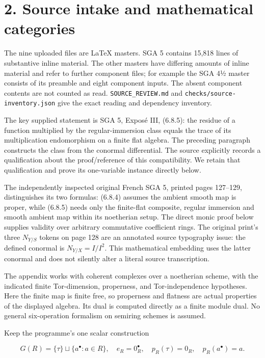 \documentclass[
  11pt,
]{article}
\begin{document}
\section{2. Source intake and mathematical
categories}\label{source-intake-and-mathematical-categories}

The nine uploaded files are LaTeX masters. SGA 5 contains 15,818 lines
of substantive inline material. The other masters have differing amounts
of inline material and refer to further component files; for example the
SGA 4½ master consists of its preamble and eight component inputs. The
absent component contents are not counted as read.
\texttt{SOURCE\_REVIEW.md} and \texttt{checks/source-inventory.json}
give the exact reading and dependency inventory.

The key supplied statement is SGA 5, Exposé III, (6.8.5): the residue of
a function multiplied by the regular-immersion class equals the trace of
its multiplication endomorphism on a finite flat algebra. The preceding
paragraph constructs the class from the conormal differential. The
source explicitly records a qualification about the proof/reference of
this compatibility. We retain that qualification and prove its
one-variable instance directly below.

The independently inspected original French SGA 5, printed pages
127--129, distinguishes its two formulas: (6.8.4) assumes the ambient
smooth map is proper, while (6.8.5) needs only the finite-flat composite,
regular immersion and smooth ambient map within its noetherian setup.
The direct monic proof below supplies validity over arbitrary commutative
coefficient rings.  The original print's three $N_{Y/S}$ tokens on page
128 are an annotated source typography issue: the defined conormal is
$N_{Y/X}=I/I^2$.  This mathematical embedding uses the latter conormal
and does not silently alter a literal source transcription.

The appendix works with coherent complexes over a noetherian scheme,
with the indicated finite Tor-dimension, properness, and
Tor-independence hypotheses. Here the finite map is finite free, so
properness and flatness are actual properties of the displayed algebra.
Its dual is computed directly as a finite module dual. No general
six-operation formalism on semiring schemes is assumed.

Keep the programme's one scalar construction

\[
G(R)=\{\tau\}\sqcup\{a^\bullet:a\in R\},
\quad e_R=0_R^\bullet,
\quad p_R(\tau)=0_R,\quad p_R(a^\bullet)=a.
\tag{3}
\]
\end{document}
